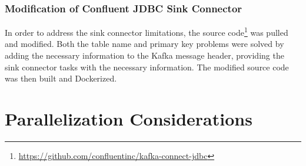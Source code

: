\subsubsection{Modification of Confluent JDBC Sink Connector}
In order to address the sink connector limitations, the source code\footnote{\url{https://github.com/confluentinc/kafka-connect-jdbc}} was pulled and modified. Both the table name and primary key problems were solved by adding the necessary information to the Kafka message header, providing the sink connector tasks with the necessary information. The modified source code was then built and Dockerized.

\section{Parallelization Considerations}
\label{ch04:pipelinedevelopment:parallelizationconsiderations}
